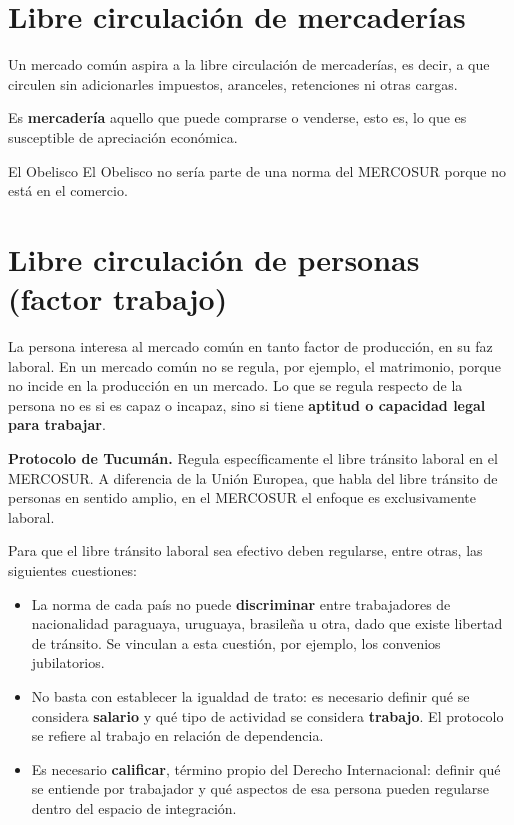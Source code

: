 \documentclass[12pt,oneside]{book}
\begin{document}
\section{Libre circulación de mercaderías}

Un mercado común aspira a la libre circulación de mercaderías, es decir, a que circulen sin adicionarles impuestos, aranceles, retenciones ni otras cargas.

Es \textbf{mercadería} aquello que puede comprarse o venderse, esto es, lo que es susceptible de apreciación económica.

\begin{example}{El Obelisco}
El Obelisco no sería parte de una norma del MERCOSUR porque no está en el comercio.
\end{example}

\section{Libre circulación de personas (factor trabajo)}

La persona interesa al mercado común en tanto factor de producción, en su faz laboral. En un mercado común no se regula, por ejemplo, el matrimonio, porque no incide en la producción en un mercado. Lo que se regula respecto de la persona no es si es capaz o incapaz, sino si tiene \textbf{aptitud o capacidad legal para trabajar}.

\begin{note}
\textbf{Protocolo de Tucumán.} Regula específicamente el libre tránsito laboral en el MERCOSUR. A diferencia de la Unión Europea, que habla del libre tránsito de personas en sentido amplio, en el MERCOSUR el enfoque es exclusivamente laboral.
\end{note}

Para que el libre tránsito laboral sea efectivo deben regularse, entre otras, las siguientes cuestiones:

\begin{itemize}
    \item La norma de cada país no puede \textbf{discriminar} entre trabajadores de nacionalidad paraguaya, uruguaya, brasileña u otra, dado que existe libertad de tránsito. Se vinculan a esta cuestión, por ejemplo, los convenios jubilatorios.
    \item No basta con establecer la igualdad de trato: es necesario definir qué se considera \textbf{salario} y qué tipo de actividad se considera \textbf{trabajo}. El protocolo se refiere al trabajo en relación de dependencia.
    \item Es necesario \textbf{calificar}, término propio del Derecho Internacional: definir qué se entiende por trabajador y qué aspectos de esa persona pueden regularse dentro del espacio de integración.
\end{itemize}
\end{document}
